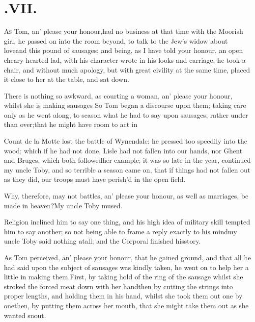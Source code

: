 \documentclass{article}
\begin{document}
\newpage
\section{.\enspace VII.}

\lettrine{A}{s} Tom, an’ please your honour,\break had no business at that time with the
Moorish girl, he passed on into the room beyond, to talk to the Jew’s widow
about love\tsh and this pound of sausages; and being, as I have told your
honour,\break
an open cheary hearted lad, with his character wrote in his looks and carriage, he
took a chair, and without much apology, but with great civility at the same time,
placed it close to her at the table, and sat down.

There is nothing so awkward, as courting a woman, an’
please your honour, whilst she is making sausages\tsh\break
So Tom began a discourse upon them;\pb 
{}
taking care only as he went along, to season what he had to say upon sausages,
rather under than over;\tsh that he might have room to act in\tsh

\noindent
{}
Count de la Motte lost the battle of Wynendale: he
pressed too speedily into the wood; which if he had not done, Lisle had not fallen
into our hands, nor Ghent and Bruges, which both followed\pb her example; it was so
late in the year, continued my uncle Toby, and so terrible a season came on, that if
things had not fallen out as they did, our troops must have perish’d in the open
field.\tsh

\tsh Why, therefore, may not battles, an’ please
your honour, as well as marriages, be made in heaven?\tsk My
uncle Toby mused.\tsh

Religion inclined him to say one thing, and his high idea of
military skill tempted him to say another; so not being able to
frame a reply exactly to his mind\break\tsh my uncle Toby
said nothing at\break all; and the Corporal finished his\break story.

\newpage
As Tom perceived, an’ please your honour, that he
gained ground, and that all he had said upon the subject of
sausages was kindly taken, he went on to help her a little in
making them.\tsh\break First, by taking hold of the ring of the
sausage whilst she stroked the forced meat down with her
hand\tsh then by cutting the strings into proper lengths,
and holding them in his hand, whilst she took them out one by
one\tsh then, by putting them across her mouth, that she might
take them out as she wanted\break
{}
snout.\tsh
\end{document}
